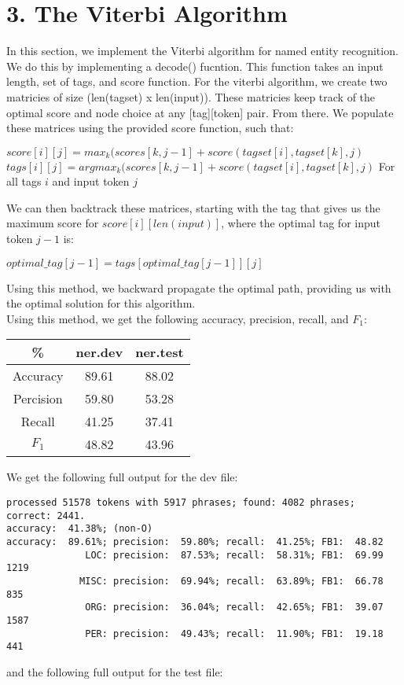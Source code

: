 \documentclass[10pt]{article}
\begin{document}
\section*{3. The Viterbi Algorithm}
In this section, we implement the Viterbi algorithm for named entity recognition. We do this by implementing a decode() fucntion. This function takes an input length, set of tags, and score function. For the viterbi algorithm, we create two matricies of size (len(tagset) x len(input)). These matricies keep track of the optimal score and node choice at any [tag][token] pair. From there. We populate these matrices using the provided score function, such that:
\begin{center}
    $score[i][j]=max_k(scores[k,j-1]+score(tagset[i], tagset[k], j)$\\
    $tags[i][j]=argmax_k(scores[k,j-1]+score(tagset[i], tagset[k], j)$
    For all tags $i$ and input token $j$
\end{center}
We can then backtrack these matrices, starting with the tag that gives us the maximum score for $score[i][len(input)]$, where the optimal tag for input token $j-1$ is:
\begin{center}
    $optimal\_tag[j-1]=tags[optimal\_tag[j-1]][j]$
\end{center}
Using this method, we backward propagate the optimal path, providing us with the optimal solution for this algorithm.\\
Using this method, we get the following accuracy, precision, recall, and $F_1$:

\begin{center}
    \begin{tabular}{ c|c|c|} 
     \% & ner.dev & ner.test\\
     
     \hline 
     Accuracy        & 89.61 & 88.02  \\ \hline
     Percision       & 59.80 & 53.28  \\ \hline
     Recall          & 41.25 & 37.41  \\ \hline
     $F_1$           & 48.82 & 43.96  \\ \hline
\end{tabular}
\end{center}
We get the following full output for the dev file:\\
\begingroup
    \fontsize{8pt}{12pt}\selectfont
    \begin{verbatim}  
processed 51578 tokens with 5917 phrases; found: 4082 phrases; correct: 2441.
accuracy:  41.38%; (non-O)
accuracy:  89.61%; precision:  59.80%; recall:  41.25%; FB1:  48.82
              LOC: precision:  87.53%; recall:  58.31%; FB1:  69.99  1219
             MISC: precision:  69.94%; recall:  63.89%; FB1:  66.78  835
              ORG: precision:  36.04%; recall:  42.65%; FB1:  39.07  1587
              PER: precision:  49.43%; recall:  11.90%; FB1:  19.18  441
\end{verbatim}  
\endgroup
\noindent and the following full output for the test file:\\
\end{document}
